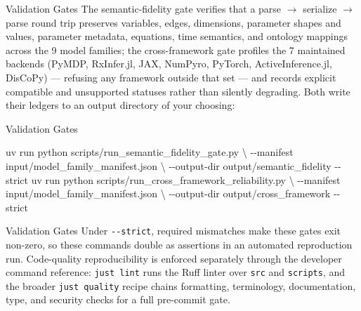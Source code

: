 \documentclass[
  ignorenonframetext,
]{beamer}
\newenvironment{Shaded}{}{}
\newcommand{\AttributeTok}[1]{\textcolor[rgb]{0.49,0.56,0.16}{#1}}
\newcommand{\DataTypeTok}[1]{\textcolor[rgb]{0.56,0.13,0.00}{#1}}
\newcommand{\ExtensionTok}[1]{#1}
\newcommand{\NormalTok}[1]{#1}
\begin{document}
\begin{frame}{Validation Gates}
The semantic-fidelity gate verifies that a parse \texorpdfstring{\ensuremath{\to}}{->} serialize \texorpdfstring{\ensuremath{\to}}{->} parse
round trip preserves variables, edges, dimensions, parameter shapes and
values, parameter metadata, equations, time semantics, and ontology
mappings across the 9 model families; the cross-framework gate profiles
the 7 maintained backends (PyMDP, RxInfer.jl, JAX, NumPyro, PyTorch,
ActiveInference.jl, DisCoPy) --- refusing any framework outside that set
--- and records explicit compatible and unsupported statuses rather than
silently degrading. Both write their ledgers to an output directory of
your choosing:

\end{frame}

\begin{frame}{Validation Gates}
\begin{Shaded}
\begin{Highlighting}[]
\ExtensionTok{uv}\NormalTok{ run python scripts/run\_semantic\_fidelity\_gate.py }\DataTypeTok{\textbackslash{}}
  \AttributeTok{{-}{-}manifest}\NormalTok{ input/model\_family\_manifest.json }\DataTypeTok{\textbackslash{}}
  \AttributeTok{{-}{-}output{-}dir}\NormalTok{ output/semantic\_fidelity }\AttributeTok{{-}{-}strict}
\ExtensionTok{uv}\NormalTok{ run python scripts/run\_cross\_framework\_reliability.py }\DataTypeTok{\textbackslash{}}
  \AttributeTok{{-}{-}manifest}\NormalTok{ input/model\_family\_manifest.json }\DataTypeTok{\textbackslash{}}
  \AttributeTok{{-}{-}output{-}dir}\NormalTok{ output/cross\_framework }\AttributeTok{{-}{-}strict}
\end{Highlighting}
\end{Shaded}

\end{frame}

\begin{frame}{Validation Gates}
Under \texttt{-\/-strict}, required mismatches make these gates exit
non-zero, so these commands double as assertions in an automated
reproduction run. Code-quality reproducibility is enforced separately
through the developer command reference: \texttt{just\ lint} runs the
Ruff linter over \texttt{src} and \texttt{scripts}, and the broader
\texttt{just\ quality} recipe chains formatting, terminology,
documentation, type, and security checks for a full pre-commit gate.
\end{frame}
\end{document}
